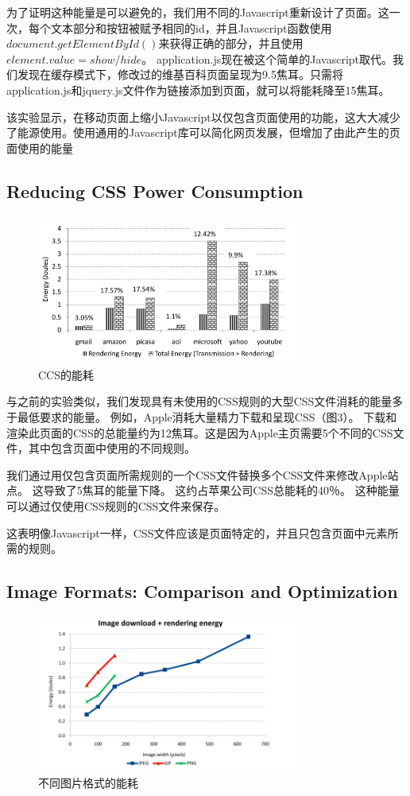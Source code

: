 \documentclass{sig-alternate-05-2015}
\begin{document}
为了证明这种能量是可以避免的，我们用不同的Javascript重新设计了页面。这一次，每个文本部分和按钮被赋予相同的id，并且Javascript函数使用$document.getElementById()$来获得正确的部分，并且使用$element.value = show/hide$。 application.js现在被这个简单的Javascript取代。我们发现在缓存模式下，修改过的维基百科页面呈现为9.5焦耳。只需将application.js和jquery.js文件作为链接添加到页面，就可以将能耗降至15焦耳。

该实验显示，在移动页面上缩小Javascript以仅包含页面使用的功能，这大大减少了能源使用。使用通用的Javascript库可以简化网页发展，但增加了由此产生的页面使用的能量

\subsection{Reducing CSS Power Consumption}

\begin{figure}[htbp]
	\centering
	\includegraphics[width=3.4in]{./figure3}
	\caption{CCS的能耗}\label{fig:tasks}
\end{figure}

与之前的实验类似，我们发现具有未使用的CSS规则的大型CSS文件消耗的能量多于最低要求的能量。 例如，Apple消耗大量精力下载和呈现CSS（图3\cite{13}）。 下载和渲染此页面的CSS的总能量约为12焦耳。这是因为Apple主页需要5个不同的CSS文件，其中包含页面中使用的不同规则。

我们通过用仅包含页面所需规则的一个CSS文件替换多个CSS文件来修改Apple站点。 这导致了5焦耳的能量下降。 这约占苹果公司CSS总能耗的40％。 这种能量可以通过仅使用CSS规则的CSS文件来保存。

这表明像Javascript一样，CSS文件应该是页面特定的，并且只包含页面中元素所需的规则。

\subsection{Image Formats: Comparison and Optimization}

\begin{figure}[htbp]
	\centering
	\includegraphics[width=3.4in]{./figure4}
	\caption{不同图片格式的能耗}\label{fig:tasks}
\end{figure}
\end{document}
